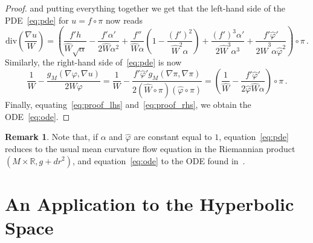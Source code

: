 \documentclass[oneside,12pt]{amsart}
\theoremstyle{definition}
\newtheorem{remark}[lemma]{Remark}
\renewcommand{\div}{\mathrm{div}}
\begin{document}
\begin{proof}
and putting everything together we get that the left-hand side of the PDE~\eqref{eq:pde} for $u = f \circ \pi$ now reads
\begin{equation} \label{eq:proof_lhs}
\div \left( \frac{\nabla u}{W} \right) = \left( \frac{f'h}{\widehat{W} \sqrt{\alpha}} - \frac{f' \alpha'}{2 \widehat{W} \alpha^2} + \frac{f''}{\widehat{W} \alpha} \left( 1 - \frac{(f')^2}{\widehat{W}^2 \alpha} \right) + \frac{(f')^3 \alpha'}{2 \widehat{W}^3 \alpha^3} + \frac{f' \widehat{\varphi}'}{2 \widehat{W}^3 \alpha \widehat{\varphi}^2}  \right) \circ \pi \, .
\end{equation}
Similarly, the right-hand side of~\eqref{eq:pde} is now
\begin{equation} \label{eq:proof_rhs}
\frac{1}{W} - \frac{g_M \left( \nabla \varphi , \nabla u \right)}{2 W \varphi} = \frac{1}{W} - \frac{f' \widehat{\varphi}' g_M \left( \nabla \pi , \nabla \pi\right)}{2 (\widehat{W} \circ \pi)(\widehat{\varphi} \circ \pi)} = \left(\frac{1}{\widehat{W}} - \frac{f' \widehat{\varphi}'}{2 \widehat{\varphi} \widehat{W} \alpha} \right) \circ \pi \, .
\end{equation}
Finally, equating~\eqref{eq:proof_lhs} and~\eqref{eq:proof_rhs}, we obtain the ODE~\eqref{eq:ode}.
\end{proof}

\begin{remark}
Note that, if $\alpha$ and $\widehat{\varphi}$ are constant equal to $1$, equation~\eqref{eq:pde} reduces to the usual mean curvature flow equation in the Riemannian product $(M \times \mathbb{R},g + dr^2)$, and equation~\eqref{eq:ode} to the ODE found in~\cite{LO}.
\end{remark}


\section{An Application to the Hyperbolic Space} \label{sec:applications}
\end{document}
